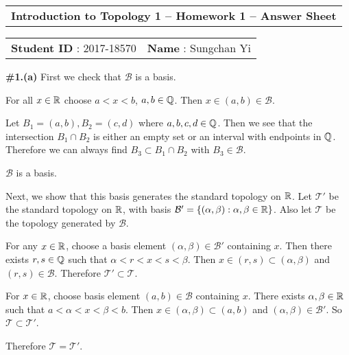 \documentclass[a4paper,11pt]{article}
\newcommand{\B}{\mathcal{B}}
\newcommand{\T}{\mathcal{T}}
\begin{document}
\begin{tabular}{l}
    {\bfseries \Large  Introduction to Topology 1 -- Homework 1 -- Answer Sheet} \\
\end{tabular}

\vspace{3mm}

\begin{tabular}{c c}
    {\bfseries \large Student ID} : 2017-18570 \hspace{40mm} & {\bfseries \large Name} : Sungchan Yi  \hspace{30mm} \\
\end{tabular}

\vspace{7mm}

\begin{minipage}[t][260mm]{90mm}
    {\bfseries \large \#1.(a)} First we check that \(\B\) is a basis.

    For all \(x \in \mathbb{R}\) choose \(a < x < b\), \(a, b \in \mathbb{Q}\). Then \(x \in (a, b) \in \B\).

    Let \(B_1 = (a, b), B_2 = (c, d)\) where \(a, b, c, d\in \mathbb{Q}\). Then we see that the intersection \(B_1 \cap B_2\) is either an empty set or an interval with endpoints in \(\mathbb{Q}\). Therefore we can always find \(B_3 \subset B_1\cap B_2\) with \(B_3 \in \B\).

    \(\B\) is a basis.

    Next, we show that this basis generates the standard topology on \(\mathbb{R}\). Let \(\T'\) be the standard topology on \(\mathbb{R}\), with basis \(\B' = \{(\alpha, \beta) : \alpha, \beta \in \R\}\). Also let \(\T\) be the topology generated by \(\B\).

    For any \(x \in \mathbb{R}\), choose a basis element \((\alpha, \beta) \in \B'\) containing \(x\). Then there exists \(r, s \in \mathbb{Q}\) such that \(\alpha < r < x < s < \beta\). Then \(x \in (r, s) \subset (\alpha, \beta)\) and \((r, s) \in \B\). Therefore \(\T' \subset \T\).

    For \(x \in \mathbb{R}\), choose basis element \((a, b) \in \B\) containing \(x\). There exists \(\alpha, \beta \in \mathbb{R}\) such that \(a < \alpha < x < \beta < b\). Then \(x \in (\alpha, \beta) \subset (a, b)\) and \((\alpha, \beta) \in \B'\). So \(\T \subset \T'\).

    Therefore \(\T = \T'\).
\end{minipage}
{\color{gray}\vline}
\end{document}
